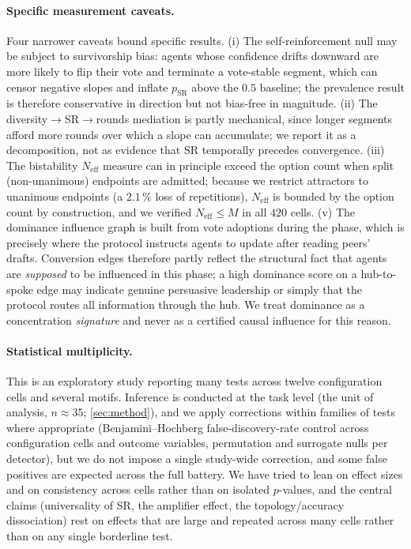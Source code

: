 \paragraph{Specific measurement caveats.}
Four narrower caveats bound specific results. (i) The self-reinforcement null may
be subject to survivorship bias: agents whose confidence drifts downward are more
likely to flip their vote and terminate a vote-stable segment, which can censor
negative slopes and inflate $p_{\mathrm{SR}}$ above the $0.5$ baseline; the
prevalence result is therefore conservative in direction but not bias-free in
magnitude. (ii) The diversity$\to$SR$\to$rounds mediation is partly mechanical,
since longer segments afford more rounds over which a slope can accumulate; we report
it as a decomposition, not as evidence that SR temporally precedes convergence.
(iii) The bistability $N_{\mathrm{eff}}$ measure can in principle exceed the option
count when split (non-unanimous) endpoints are admitted; because we restrict
attractors to unanimous endpoints (a $2.1\,\%$ loss of repetitions),
$N_{\mathrm{eff}}$ is bounded by the option count by construction, and we verified
$N_{\mathrm{eff}} \leq M$ in all $420$ cells.
(v) The dominance influence graph is built from vote adoptions during the
\updatephase{} phase, which is precisely where the protocol instructs agents to
update after reading peers' \arguephase{} drafts.
Conversion edges therefore partly reflect the structural fact that agents are
\emph{supposed} to be influenced in this phase; a high dominance score on a
hub-to-spoke edge may indicate genuine persuasive leadership or simply that the
protocol routes all information through the hub.
We treat dominance as a concentration \emph{signature} and never as a certified
causal influence for this reason.

\paragraph{Statistical multiplicity.}
This is an exploratory study reporting many tests across twelve configuration
cells and several motifs. Inference is conducted at the task level (the unit of
analysis, $n \approx 35$; \autoref{sec:method}), and we apply corrections within
families of tests where appropriate (Benjamini--Hochberg false-discovery-rate
control across configuration cells and outcome variables, permutation and
surrogate nulls per detector), but we do not impose a single study-wide
correction, and some false positives are expected across the full battery. We have
tried to lean on effect sizes and on consistency across cells rather than on
isolated $p$-values, and the central claims (universality of SR, the amplifier
effect, the topology/accuracy dissociation) rest on effects that are large and
repeated across many cells rather than on any single borderline test.


